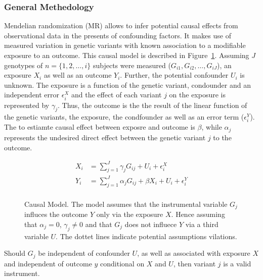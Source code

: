 \subsubsection{General Methedology}
\label{ssub:General_Methedology}

Mendelian randomization (MR) allows to infer potential causal effects from observational data in the presents of confounding factors. 
It makes use of measured variation in genetic variants with known association to a modifiable exposure to an outcome.
This causal model is described in Figure~\ref{fig:causal}.
Assuming $J$ genotypes of $n=\{1, 2, \ldots , i\}$ subjects were measured ($G_{i1}, G_{i2}, \ldots , G_{iJ}$),
an exposure $X_i$ as well as an outcome $Y_i$.
Further, the potential confounder $U_i$ is unknown. 
The exposure is a function of the genetic variant, condounder and an independent error $\epsilon_i^X$ 
and the effect of each variant $j$ on the exposure is represented by $\gamma_j$.
Thus, the outcome is the the result of the linear function of the genetic variants, the exposure, the condfounder as well as an error term ($\epsilon_i^Y$).
The to estiamte causal effect between exposre and outcome is $\beta$, while $\alpha_j$ represents the undesired direct effect between the genetic variant $j$ to the outcome.

\begin{equation} \label{eq:rm_basic}
  \begin{split}
    X_i &= \sum^J_{j=1} \gamma_jG_{ij} + U_i + \epsilon_i^X \\
    Y_i &= \sum^J_{j=1} \alpha_jG_{ij} + \beta X_i + U_i + \epsilon_i^Y \\
  \end{split}
\end{equation}

\begin{figure}[!h]
  \centering
  \resizebox{0.5\textwidth}{!}{}
  \caption{Causal Model.
    The model assumes that the instrumental variable $G_j$ influces the outcome $Y$ only via the exposure $X$.
    Hence assuming that $\alpha_j=0$, $\gamma_j\neq0$ and that $G_j$ does not influece $Y$ via a third variable $U$. 
    The dottet lines indicate potential assumptions vilations.
  }\label{fig:causal}
\end{figure}


Should $G_j$ be independent of confounder $U$,
as well as associated with exposure $X$ and independent of outcome $y$ conditional on $X$ and $U$, then variant $j$ is a valid instrument.

